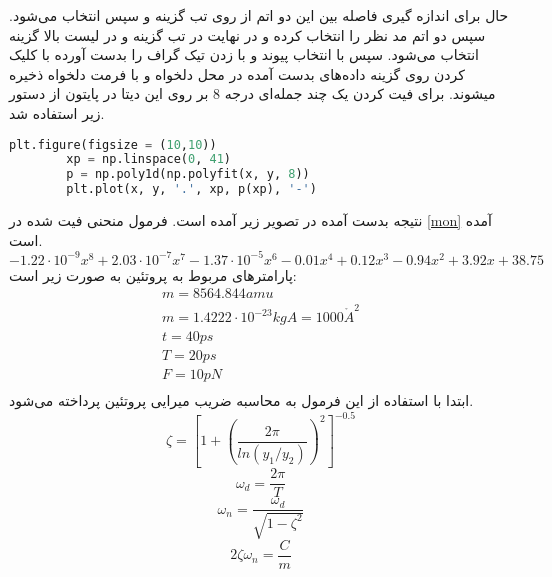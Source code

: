 حال برای اندازه گیری فاصله بین این دو اتم از روی تب  گزینه  و سپس  انتخاب می‌شود. سپس دو اتم مد نظر را انتخاب کرده و در نهایت در تب  گزینه  و در لیست بالا گزینه  انتخاب می‌شود.
سپس با انتخاب پیوند و با زدن تیک  گراف را بدست آورده با کلیک کردن روی گزینه  داده‌‌های بدست آمده در محل دلخواه و با فرمت دلخواه ذخیره میشوند.
برای فیت کردن یک چند جمله‌ای درجه 8 بر روی این دیتا در پایتون از دستور زیر استفاده شد.
\begin{latin}
	\begin{lstlisting}[language=Python]
		plt.figure(figsize = (10,10))
		xp = np.linspace(0, 41)
		p = np.poly1d(np.polyfit(x, y, 8))
		plt.plot(x, y, '.', xp, p(xp), '-')
	\end{lstlisting}
\end{latin}
نتیجه بدست آمده در تصویر زیر آمده است.
فرمول منحنی فیت شده در \ref{mon} آمده است.
\begin{equation}
	-1.22 \cdot 10^{-9} x^{8} + 2.03 \cdot 10^{-7} x^{7} - 1.37 \cdot 10^{-5} x^{6} - 0.01 x^{4} + 0.12 x^{3} - 0.94 x^{2} + 3.92 x + 38.75
	\label{mon}
\end{equation}
پارامتر‌‌های مربوط به پروتئین به صورت زیر است:
\begin{equation}
	\begin{gathered}
		m = 8564.844 amu\\
		m = 1.4222\cdot10^{-23} kg
		A = 1000 \mathring{A}^2\\
		t = 40 ps\\
		T = 20 ps\\
		F = 10 pN\\
	\end{gathered}
\end{equation}
ابتدا با استفاده از این فرمول به محاسبه ضریب میرایی پروتئین پرداخته می‌شود.
\begin{equation}
	\zeta = \left[1+\left(\frac{2\pi}{ln(y_1/y_2)}\right)^2\right]^{-0.5}
\end{equation}
\begin{equation}
	\omega_d = \frac{2\pi}{T}
\end{equation}
\begin{equation}
	\omega_n = \frac{\omega_d}{\sqrt{1-\zeta^2}}
\end{equation}
\begin{equation}
	2\zeta\omega_n = \frac{C}{m}
\end{equation}
